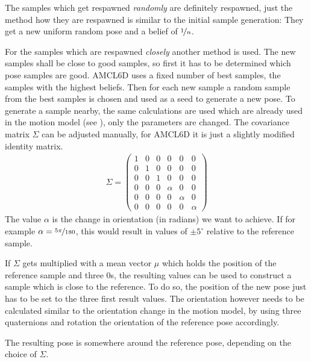 \documentclass[Thesis.tex]{subfiles}
\begin{document}
The samples which get respawned \emph{randomly} are definitely respawned, just the method how they are respawned is similar to the initial sample generation: They get a new uniform random pose and a belief of $\nicefrac{1}{n}$.

For the samples which are respawned \emph{closely} another method is used. The new samples shall be close to good samples, so first it has to be determined which pose samples are good. \gls{AMCL6D} uses a fixed number of best samples, the samples with the highest beliefs. Then for each new sample a random sample from the best samples is chosen and used as a seed to generate a new pose. To generate a sample nearby, the same calculations are used which are already used in the motion model (see ), only the parameters are changed. The covariance matrix $\Sigma$ can be adjusted manually, for \gls{AMCL6D} it is just a slightly modified identity matrix.
\begin{align}
\Sigma = \left(\begin{array}{cccccc}
1 & 0 & 0 & 0 & 0 & 0 \\
0 & 1 & 0 & 0 & 0 & 0 \\
0 & 0 & 1 & 0 & 0 & 0 \\
0 & 0 & 0 & \alpha & 0 & 0 \\
0 & 0 & 0 & 0 & \alpha & 0 \\
0 & 0 & 0 & 0 & 0 & \alpha
\end{array}\right)
\end{align}
The value $\alpha$ is the change in orientation (in radians) we want to achieve. If for example $\alpha = \nicefrac{5\pi}{180}$, this would result in values of $\pm 5^\circ$ relative to the reference sample.

If $\Sigma$ gets multiplied with a mean vector $\mu$ which holds the position of the reference sample and three $0$s, the resulting values can be used to construct a sample which is close to the reference. To do so, the position of the new pose just has to be set to the three first result values. The orientation however needs to be calculated similar to the orientation change in the motion model, by using three quaternions and rotation the orientation of the reference pose accordingly.

The resulting pose is somewhere around the reference pose, depending on the choice of $\Sigma$.
\end{document}
